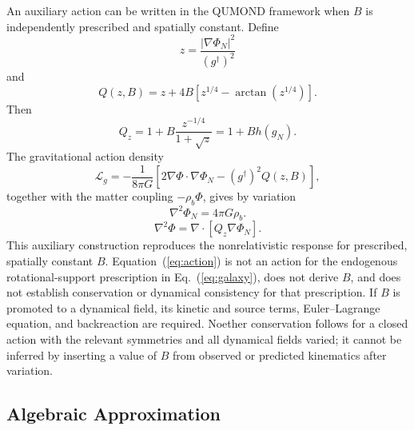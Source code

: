 \documentclass[aps,prd,reprint,superscriptaddress,showpacs,floatfix,longbibliography]{revtex4-2}
\begin{document}
An auxiliary action can be written in the QUMOND framework \cite{ref6} when $B$ is independently prescribed and spatially constant. Define
\begin{equation}
z=\frac{|\nabla\Phi_N|^2}{(g^\dagger)^2}
\label{eq:z}
\end{equation}
and
\begin{equation}
Q(z,B)=z+4B\left[z^{1/4}-\arctan\!\left(z^{1/4}\right)\right].
\label{eq:Q}
\end{equation}
Then
\begin{equation}
Q_z=1+B\frac{z^{-1/4}}{1+\sqrt z}
=1+B h(g_N).
\label{eq:Qz}
\end{equation}
The gravitational action density
\begin{equation}
\mathcal L_g=-\frac{1}{8\pi G}
\left[2\nabla\Phi\cdot\nabla\Phi_N-(g^\dagger)^2Q(z,B)\right],
\label{eq:action}
\end{equation}
together with the matter coupling $-\rho_b\Phi$, gives by variation
\begin{equation}
\nabla^2\Phi_N=4\pi G\rho_b.
\label{eq:fieldN}
\end{equation}
\begin{equation}
\nabla^2\Phi=\nabla\cdot\left[Q_z\nabla\Phi_N\right].
\label{eq:fields}
\end{equation}
This auxiliary construction reproduces the nonrelativistic response for prescribed, spatially constant $B$. Equation~(\ref{eq:action}) is not an action for the endogenous rotational-support prescription in Eq.~(\ref{eq:galaxy}), does not derive $B$, and does not establish conservation or dynamical consistency for that prescription. If $B$ is promoted to a dynamical field, its kinetic and source terms, Euler--Lagrange equation, and backreaction are required. Noether conservation follows for a closed action with the relevant symmetries and all dynamical fields varied; it cannot be inferred by inserting a value of $B$ from observed or predicted kinematics after variation.

\subsection{Algebraic Approximation}
\end{document}
